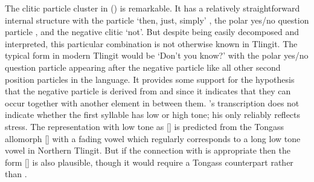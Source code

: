 The clitic particle cluster  in (\lastx) is remarkable.
It has a relatively straightforward internal structure with the particle  ‘then, just, simply’ \parencite[32]{leer:1978b}, the polar yes/no question particle , and the negative clitic  ‘not’.
But despite being easily decomposed and interpreted, this particular combination is not otherwise known in Tlingit.
The typical form in modern Tlingit would be  ‘Don’t you know?’ with the polar yes/no question particle  appearing after the negative particle  like all other second position particles in the language.
It provides some support for the hypothesis that the negative particle  is derived from  and  since it indicates that they can occur together with another element in between them.
\citeauthor{swanton:1909}’s transcription  does not indicate whether the first syllable has low or high tone; his  only reliably reflects stress.
The representation with low tone as  [] is predicted from the Tongass allomorph  [] with a fading vowel which regularly corresponds to a long low tone vowel in Northern Tlingit.
But if the connection with  is appropriate then the form  [] is also plausible, though it would require a Tongass counterpart  rather than .
